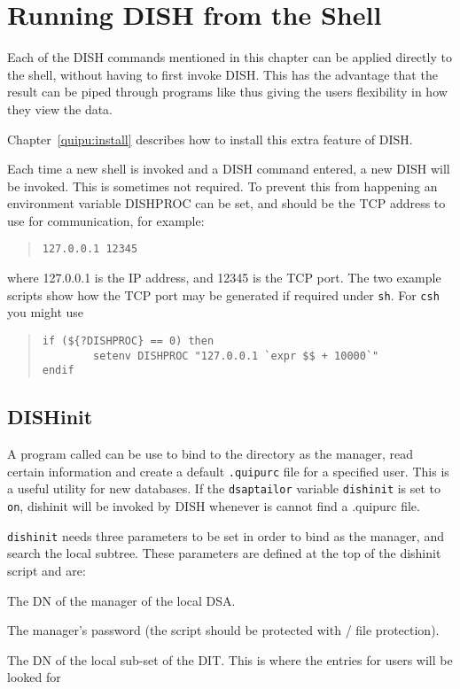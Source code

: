 \section {Running DISH from the Shell}
\label{dish_shell}

Each of the DISH commands mentioned in this chapter
can be applied directly to the shell, without having to first invoke
DISH.  This has the advantage that the result can be piped through
programs like  thus giving the users flexibility in how
they view the data.

Chapter~\ref{quipu:install} describes how to install this extra feature of
DISH.

Each time a new shell is invoked and a DISH command entered, a new DISH will
be invoked.  This is sometimes not required.  To prevent this from happening
an environment variable DISHPROC can be set, and should be the TCP
address to use for communication, for example:
\begin{quote}\begin{verbatim}
127.0.0.1 12345
\end{verbatim}\end{quote}
where 127.0.0.1 is the IP address, and 12345 is the TCP port.
The two example scripts show how the TCP port may be generated if required
under \verb+sh+.
For \verb+csh+ you might use
\begin{quote}\begin{verbatim}
if (${?DISHPROC} == 0) then
        setenv DISHPROC "127.0.0.1 `expr $$ + 10000`"
endif
\end{verbatim}\end{quote}

\subsection {DISHinit}
A program called  
\label{dishinit}
can be use to 
bind to the directory as the manager, read certain information
and create a 
default \verb".quipurc"
file for a specified user.
This is a useful utility for new databases.
If the \verb"dsaptailor" variable \verb"dishinit" is set to \verb"on",
dishinit will be invoked by DISH whenever is cannot find a 
.quipurc file.

\verb"dishinit" needs three parameters to be set in order to bind as the 
manager, and search the local subtree.
These parameters are defined at the top of the dishinit script and are:
\begin{describe}
\item [\verb+manager+:] The DN of the manager of the local DSA.
\item [\verb+password+:] The manager's password (the script should be protected 
with \unix/ file protection).
\item [\verb+position+:] The DN of the local sub-set of the DIT. This is where 
the entries for users will be looked for
\end{describe}

